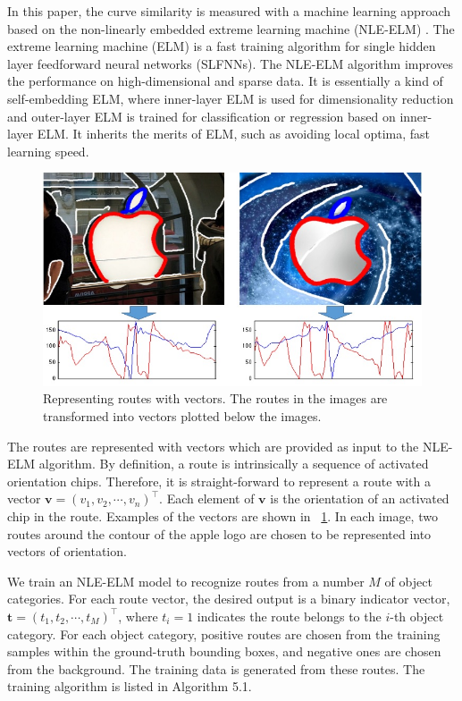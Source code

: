 \documentclass{article}
\begin{document}
In this paper, the curve similarity is measured with a machine learning approach based on 
the non-linearly embedded extreme learning machine (NLE-ELM) \cite{liu2015}.
The extreme learning machine (ELM) \cite{huang2006,tang2015,mohammed2011,huang2014}
is a fast training algorithm for single hidden layer feedforward neural networks (SLFNNs).
The NLE-ELM algorithm improves the performance on high-dimensional and sparse data.
It is essentially a kind of self-embedding ELM, 
where inner-layer ELM is used for dimensionality reduction 
and outer-layer ELM is trained for classification or regression based on inner-layer ELM. 
It inherits the merits of ELM, such as avoiding local optima, fast learning speed. 

\begin{figure}[!t]
\centering
\includegraphics[width=0.9\linewidth]{images/fig12.jpg}
\caption{Representing routes with vectors.
The routes in the images are transformed into vectors plotted below the images.}
\label{fig:12}
\end{figure}

The routes are represented with vectors which are provided as input to the NLE-ELM algorithm.
By definition, a route is intrinsically a sequence of activated orientation chips.
Therefore, it is straight-forward to represent a route with a vector $\mathbf{v}=(v_1,v_2,\cdots,v_n)^\top$.
Each element of $\mathbf{v}$ is the orientation of an activated chip in the route.
Examples of the vectors are shown in \figurename~\ref{fig:12}.
In each image, two routes around the contour of the apple logo are chosen to be represented into vectors of orientation.

We train an NLE-ELM model to recognize routes from a number $M$ of object categories.
For each route vector, the desired output is a binary indicator vector, $\mathbf{t}=(t_1,t_2,\cdots,t_M)^\top$,
where $t_i=1$ indicates the route belongs to the $i$-th object category.  
For each object category, positive routes are chosen from the training samples within the ground-truth bounding boxes,
and negative ones are chosen from the background.
The training data is generated from these routes.
The training algorithm is listed in Algorithm 5.1.
\end{document}

